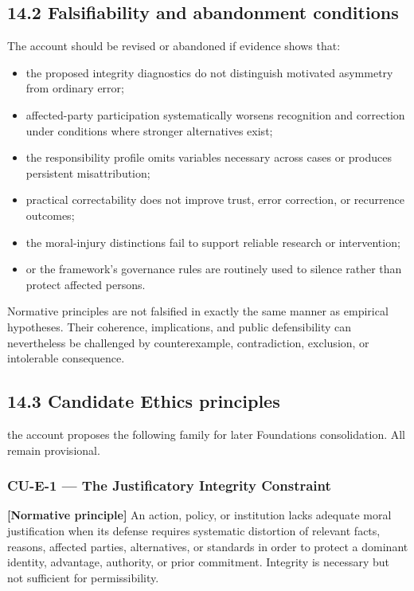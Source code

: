 \documentclass[
  11pt,
]{article}
\providecommand{\tightlist}{%
  \setlength{\itemsep}{0pt}\setlength{\parskip}{0pt}}
\begin{document}
\subsection{14.2 Falsifiability and abandonment
conditions}\label{falsifiability-and-abandonment-conditions}

The account should be revised or abandoned if evidence shows that:

\begin{itemize}
\tightlist
\item
  the proposed integrity diagnostics do not distinguish motivated
  asymmetry from ordinary error;
\item
  affected-party participation systematically worsens recognition and
  correction under conditions where stronger alternatives exist;
\item
  the responsibility profile omits variables necessary across cases or
  produces persistent misattribution;
\item
  practical correctability does not improve trust, error correction, or
  recurrence outcomes;
\item
  the moral-injury distinctions fail to support reliable research or
  intervention;
\item
  or the framework's governance rules are routinely used to silence
  rather than protect affected persons.
\end{itemize}

Normative principles are not falsified in exactly the same manner as
empirical hypotheses. Their coherence, implications, and public
defensibility can nevertheless be challenged by counterexample,
contradiction, exclusion, or intolerable consequence.

\subsection{14.3 Candidate Ethics
principles}\label{candidate-ethics-principles}

the account proposes the following family for later Foundations
consolidation. All remain provisional.

\subsubsection{CU-E-1 --- The Justificatory Integrity
Constraint}\label{cu-e-1-the-justificatory-integrity-constraint}

\textbf{{[}Normative principle{]}} An action, policy, or institution
lacks adequate moral justification when its defense requires systematic
distortion of relevant facts, reasons, affected parties, alternatives,
or standards in order to protect a dominant identity, advantage,
authority, or prior commitment. Integrity is necessary but not
sufficient for permissibility.
\end{document}
